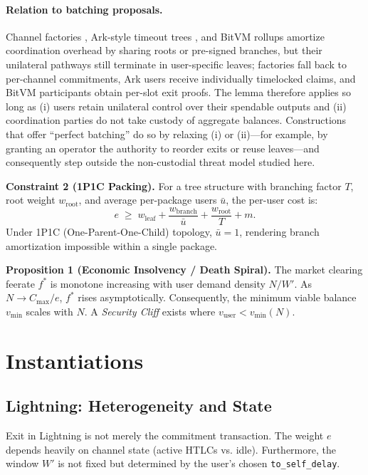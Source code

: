 \documentclass{article}
\theoremstyle{definition}
\begin{document}
\paragraph{Relation to batching proposals.}
Channel factories \cite{factory}, Ark-style timeout trees \cite{ark}, and BitVM rollups \cite{bitvm} amortize coordination overhead by sharing roots or pre-signed branches, but their unilateral pathways still terminate in user-specific leaves; factories fall back to per-channel commitments, Ark users receive individually timelocked claims, and BitVM participants obtain per-slot exit proofs. The lemma therefore applies so long as (i) users retain unilateral control over their spendable outputs and (ii) coordination parties do not take custody of aggregate balances. Constructions that offer ``perfect batching'' do so by relaxing (i) or (ii)---for example, by granting an operator the authority to reorder exits or reuse leaves---and consequently step outside the non-custodial threat model studied here.

\medskip
\noindent\textbf{Constraint 2 (1P1C Packing).}
For a tree structure with branching factor $T$, root weight $w_{\mathrm{root}}$, and average per-package users $\bar{u}$, the per-user cost is:
\small
\begin{equation*}
e \;\ge\; w_{\mathrm{leaf}} + \frac{w_{\mathrm{branch}}}{\bar{u}} + \frac{w_{\mathrm{root}}}{T} + m.
\end{equation*}
\normalsize
Under 1P1C (One-Parent-One-Child) topology, $\bar{u}=1$, rendering branch amortization impossible within a single package.

\medskip
\noindent\textbf{Proposition 1 (Economic Insolvency / Death Spiral).}
The market clearing feerate $f^*$ is monotone increasing with user demand density $N/W'$. As $N \to C_{\max}/e$, $f^*$ rises asymptotically.
Consequently, the minimum viable balance $v_{\min}$ scales with $N$. A \emph{Security Cliff} exists where $v_{\mathrm{user}} < v_{\min}(N)$.

\section{Instantiations}
\subsection{Lightning: Heterogeneity and State}
Exit in Lightning is not merely the commitment transaction. The weight $e$ depends heavily on channel state (active HTLCs vs. idle). Furthermore, the window $W'$ is not fixed but determined by the user's chosen \texttt{to\_self\_delay}.
\end{document}
